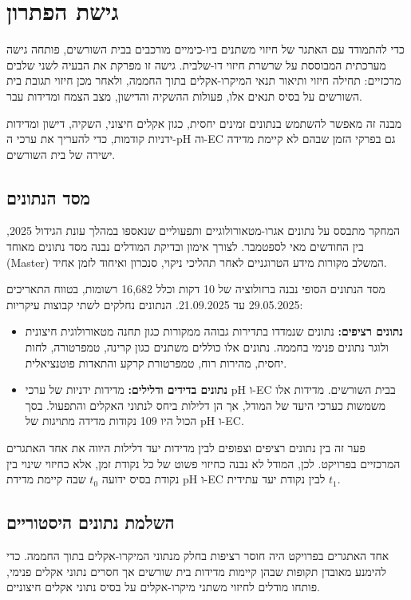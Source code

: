 \section{גישת הפתרון}

כדי להתמודד עם האתגר של חיזוי משתנים ביו-כימיים מורכבים בבית השורשים, פותחה גישה מערכתית המבוססת על שרשרת חיזוי דו-שלבית. גישה זו מפרקת את הבעיה לשני שלבים מרכזיים: תחילה חיזוי ותיאור תנאי המיקרו-אקלים בתוך החממה, ולאחר מכן חיזוי תגובת בית השורשים על בסיס תנאים אלו, פעולות ההשקיה והדישון, מצב הצמח ומדידות עבר.

מבנה זה מאפשר להשתמש בנתונים זמינים יחסית, כגון אקלים חיצוני, השקיה, דישון ומדידות ידניות קודמות, כדי להעריך את ערכי ה-pH וה-EC גם בפרקי הזמן שבהם לא קיימת מדידה ישירה של בית השורשים.

\subsection{מסד הנתונים}
המחקר מתבסס על נתונים אגרו-מטאורולוגיים ותפעוליים שנאספו במהלך עונת הגידול 2025, בין החודשים מאי לספטמבר. לצורך אימון ובדיקת המודלים נבנה מסד נתונים מאוחד (Master) המשלב מקורות מידע הטרוגניים לאחר תהליכי ניקוי, סנכרון ואיחוד לזמן אחיד.

מסד הנתונים הסופי נבנה ברזולוציה של 10 דקות וכלל 16{,}682 רשומות, בטווח התאריכים 29.05.2025 עד 21.09.2025. הנתונים נחלקים לשתי קבוצות עיקריות:

\begin{itemize}
    \item \textbf{נתונים רציפים:} נתונים שנמדדו בתדירות גבוהה ממקורות כגון תחנה מטאורולוגית חיצונית ולוגר נתונים פנימי בחממה. נתונים אלו כוללים משתנים כגון קרינה, טמפרטורה, לחות יחסית, מהירות רוח, טמפרטורת קרקע והתאדות פוטנציאלית.
    \item \textbf{נתונים בדידים ודלילים:} מדידות ידניות של ערכי pH ו-EC בבית השורשים. מדידות אלו משמשות כערכי היעד של המודל, אך הן דלילות ביחס לנתוני האקלים והתפעול. בסך הכול היו 109 נקודות מדידה מתויגות של pH ו-EC.
\end{itemize}

פער זה בין נתונים רציפים וצפופים לבין מדידות יעד דלילות היווה את אחד האתגרים המרכזיים בפרויקט. לכן, המודל לא נבנה כחיזוי פשוט של כל נקודת זמן, אלא כחיזוי שינוי בין נקודת בסיס ידועה $t_0$ שבה קיימת מדידת pH ו-EC לבין נקודת יעד עתידית $t_1$.

\subsection{השלמת נתונים היסטוריים }
אחד האתגרים בפרויקט היה חוסר רציפות בחלק מנתוני המיקרו-אקלים בתוך החממה. כדי להימנע מאובדן תקופות שבהן קיימות מדידות בית שורשים אך חסרים נתוני אקלים פנימי, פותחו מודלים לחיזוי משתני מיקרו-אקלים על בסיס נתוני אקלים חיצוניים.

